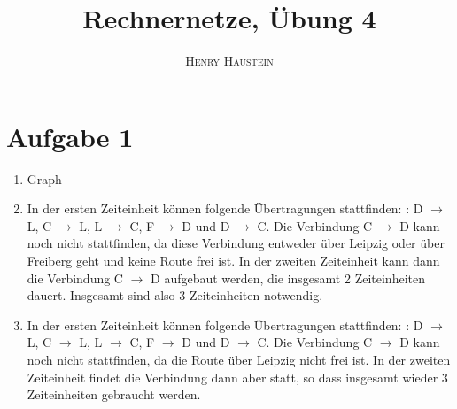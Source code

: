 \documentclass{article}
\title{\textbf{Rechnernetze, Übung 4}}
\author{\textsc{Henry Haustein}}
\date{}
\begin{document}
	\maketitle
	
	\section*{Aufgabe 1}
	\begin{enumerate}[label=(\alph*)]
		\item Graph
		\begin{center}
		\end{center}
		\item In der ersten Zeiteinheit können folgende Übertragungen stattfinden: : D $\to$ L, C $\to$ L, L $\to$ C, F $\to$ D und D $\to$ C. Die Verbindung C $\to$ D kann noch nicht stattfinden, da diese Verbindung entweder über Leipzig oder über Freiberg geht und keine Route frei ist. In der zweiten Zeiteinheit kann dann die Verbindung C $\to$ D aufgebaut werden, die insgesamt 2 Zeiteinheiten dauert. Insgesamt sind also 3 Zeiteinheiten notwendig.
		\item In der ersten Zeiteinheit können folgende Übertragungen stattfinden: : D $\to$ L, C $\to$ L, L $\to$ C, F $\to$ D und D $\to$ C. Die Verbindung C $\to$ D kann noch nicht stattfinden, da die Route über Leipzig nicht frei ist. In der zweiten Zeiteinheit findet die Verbindung dann aber statt, so dass insgesamt wieder 3 Zeiteinheiten gebraucht werden.
	\end{enumerate}
\end{document}
